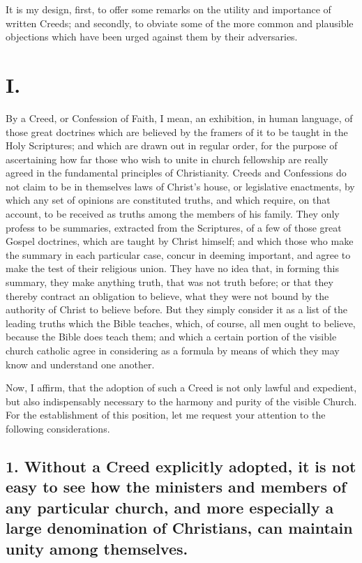 \documentclass[
]{book}
\begin{document}
It is my design, first, to offer some remarks on the utility and importance of written Creeds; and secondly, to obviate some of the more common and plausible objections which have been urged against them by their adversaries.

\hypertarget{i.}{%
\section{I.}\label{i.}}

By a Creed, or Confession of Faith, I mean, an exhibition, in human language, of those great doctrines which are believed by the framers of it to be taught in the Holy Scriptures; and which are drawn out in regular order, for the purpose of ascertaining how far those who wish to unite in church fellowship are really agreed in the fundamental principles of Christianity. Creeds and Confessions do not claim to be in themselves laws of Christ's house, or legislative enactments, by which any set of opinions are constituted truths, and which require, on that account, to be received as truths among the members of his family. They only profess to be summaries, extracted from the Scriptures, of a few of those great Gospel doctrines, which are taught by Christ himself; and which those who make the summary in each particular case, concur in deeming important, and agree to make the test of their religious union. They have no idea that, in forming this summary, they make anything truth, that was not truth before; or that they thereby contract an obligation to believe, what they were not bound by the authority of Christ to believe before. But they simply consider it as a list of the leading truths which the Bible teaches, which, of course, all men ought to believe, because the Bible does teach them; and which a certain portion of the visible church catholic agree in considering as a formula by means of which they may know and understand one another.

Now, I affirm, that the adoption of such a Creed is not only lawful and expedient, but also indispensably necessary to the harmony and purity of the visible Church. For the establishment of this position, let me request your attention to the following considerations.

\hypertarget{without-a-creed-explicitly-adopted-it-is-not-easy-to-see-how-the-ministers-and-members-of-any-particular-church-and-more-especially-a-large-denomination-of-christians-can-maintain-unity-among-themselves.}{%
\subsection{1. Without a Creed explicitly adopted, it is not easy to see how the ministers and members of any particular church, and more especially a large denomination of Christians, can maintain unity among themselves.}\label{without-a-creed-explicitly-adopted-it-is-not-easy-to-see-how-the-ministers-and-members-of-any-particular-church-and-more-especially-a-large-denomination-of-christians-can-maintain-unity-among-themselves.}}
\end{document}
